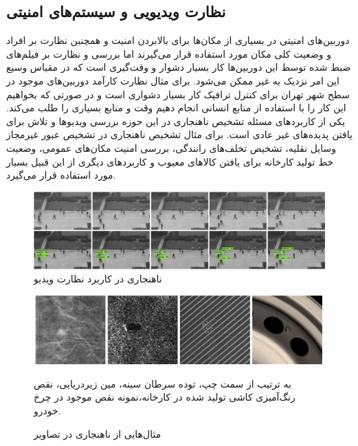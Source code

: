 \documentclass[12pt,a4paper]{report}
\theoremstyle{definition}
\theoremstyle{definition}
\begin{document}
\subsection{نظارت ویدیویی و سیستم‌های امنیتی}
دوربین‌های امنیتی در بسیاری از مکان‌ها برای بالابردن امنیت و همچنین نظارت بر افراد و وضعیت کلی مکان مورد استفاده قرار می‌گیرند اما بررسی و نظارت بر فیلم‌های ضبط شده توسط این دوربین‌ها کار بسیار دشوار و وقت‌گیری است که در مقیاس وسیع این امر نزدیک به غیر ممکن می‌شود. برای مثال نظارت کار‌آمد دوربین‌های موجود در سطح شهر تهران برای کنترل ترافیک کار بسیار دشواری است و در صورتی که بخواهیم این کار را با استفاده از منابع انسانی انجام دهیم وقت و منابع بسیاری را طلب می‌کند. یکی از کاربرد‌های مسئله تشخیص ناهنجاری در این حوزه بررسی ویدیو‌ها و تلاش برای یافتن پدیده‌های غیر عادی است. برای مثال تشخیص ناهنجاری در تشخیص عبور غیرمجاز وسایل نقلیه، تشخیص تخلف‌های رانندگی، بررسی امنیت مکان‌های عمومی، وضعیت خط تولید کارخانه برای یافتن کالاهای معیوب و کاربرد‌های دیگری از این قبیل بسیار مورد استفاده قرار می‌گیرد.
\begin{figure}[!hp]
	\begin{center}
		\includegraphics[width=\linewidth]{./images/figures/walkway-anomaly.png}
		\caption{ناهنجاری در کاربرد نظارت ویدیو~\cite{10.1016/j.compeleceng.2019.02.017}}
		\label{fig:walkway-anomaly}
	\end{center}
\end{figure}

\begin{figure}[!hp]
	\begin{center}
		\includegraphics[width=\linewidth]{./images/figures/image-anomaly-examples-1.png}
		\caption*{به ترتیب از سمت چپ، توده سرطان سینه، مین زیر‌دریایی، نقص رنگ‌آمیزی کاشی تولید شده در کارخانه،نمونه نقص موجود در چرخ خودرو.}
		\caption{
		مثال‌هایی از ناهنجاری در تصاویر
		\cite{T.Ehret}
		}		
		\label{fig:anomaly-example-1}
		\centering
	\end{center}
\end{figure}
\end{document}
